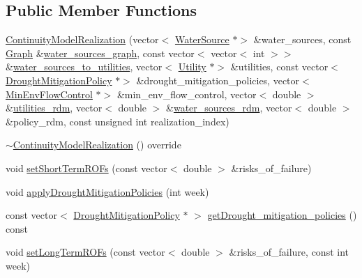 \subsection*{Public Member Functions}
\begin{DoxyCompactItemize}
\item 
\mbox{\hyperlink{classContinuityModelRealization_a641c096ac73586597b3e21a5d516c923}{Continuity\+Model\+Realization}} (vector$<$ \mbox{\hyperlink{classWaterSource}{Water\+Source}} $\ast$$>$ \&water\+\_\+sources, const \mbox{\hyperlink{classGraph}{Graph}} \&\mbox{\hyperlink{classContinuityModel_a563401588c6fa622f03393909a3522db}{water\+\_\+sources\+\_\+graph}}, const vector$<$ vector$<$ int $>$$>$ \&\mbox{\hyperlink{classContinuityModel_ae8516bcbbf52650190277fc8b06c1843}{water\+\_\+sources\+\_\+to\+\_\+utilities}}, vector$<$ \mbox{\hyperlink{classUtility}{Utility}} $\ast$$>$ \&utilities, const vector$<$ \mbox{\hyperlink{classDroughtMitigationPolicy}{Drought\+Mitigation\+Policy}} $\ast$$>$ \&drought\+\_\+mitigation\+\_\+policies, vector$<$ \mbox{\hyperlink{classMinEnvFlowControl}{Min\+Env\+Flow\+Control}} $\ast$$>$ \&min\+\_\+env\+\_\+flow\+\_\+control, vector$<$ double $>$ \&\mbox{\hyperlink{classContinuityModel_aa4a00b76da6295d2faa11e3dcaea1896}{utilities\+\_\+rdm}}, vector$<$ double $>$ \&\mbox{\hyperlink{classContinuityModel_ab7b8fa93a6f56b328e425e1ead6cfefa}{water\+\_\+sources\+\_\+rdm}}, vector$<$ double $>$ \&policy\+\_\+rdm, const unsigned int realization\+\_\+index)
\item 
\mbox{\hyperlink{classContinuityModelRealization_afd53069e2f9ab96210ff153d16f01269}{$\sim$\+Continuity\+Model\+Realization}} () override
\item 
void \mbox{\hyperlink{classContinuityModelRealization_a2db1784f020ed147335894022e20e457}{set\+Short\+Term\+R\+O\+Fs}} (const vector$<$ double $>$ \&risks\+\_\+of\+\_\+failure)
\item 
void \mbox{\hyperlink{classContinuityModelRealization_a1841f4ca49c150cf5d790f6d42496575}{apply\+Drought\+Mitigation\+Policies}} (int week)
\item 
const vector$<$ \mbox{\hyperlink{classDroughtMitigationPolicy}{Drought\+Mitigation\+Policy}} $\ast$ $>$ \mbox{\hyperlink{classContinuityModelRealization_acdbf441e416f406afe47afb7f35c11c8}{get\+Drought\+\_\+mitigation\+\_\+policies}} () const
\item 
void \mbox{\hyperlink{classContinuityModelRealization_a45cde9269efee4dc94f4905769983c9f}{set\+Long\+Term\+R\+O\+Fs}} (const vector$<$ double $>$ \&risks\+\_\+of\+\_\+failure, const int week)
\end{DoxyCompactItemize}
